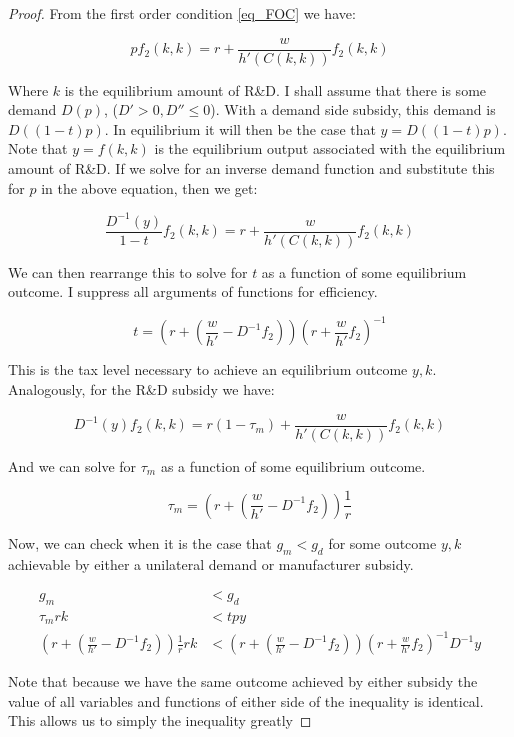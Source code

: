\documentclass{article}
\begin{document}
\begin{proof}
From the first order condition \ref{eq_FOC} we have:

\[
p f_2(k,k) = r + \frac{w}{h'(C(k,k))} f_2 (k,k)
\]

Where $k$ is the equilibrium amount of R\&D. I shall assume that there is some demand $D(p)$, ($D'>0, D'' \leq 0$). With a demand side subsidy, this demand is $D((1-t)p)$. In equilibrium it will then be the case that $y = D((1-t)p) $. Note that $y = f(k,k)$ is the equilibrium output associated with the equilibrium amount of R\&D. If we solve for an inverse demand function and substitute this for $p$ in the above equation, then we get:

\[
\frac{D^{-1}(y)}{1-t} f_2(k,k) = r + \frac{w}{h'(C(k,k))} f_2 (k,k)
\]

We can then rearrange this to solve for $t$ as a function of some equilibrium outcome. I suppress all arguments of functions for efficiency. 

\begin{equation}
t = \left(r + \left( \frac{w}{h'} - D^{-1} f_2 \right) \right) \left( r + \frac{w}{h'} f_2 \right)^{-1}
\label{t}
\end{equation}

This is the tax level necessary to achieve an equilibrium outcome $y,k$.  Analogously, for the R\&D subsidy we have:

\[
D^{-1}(y) f_2(k,k) = r(1-\tau_m) + \frac{w}{h'(C(k,k))} f_2 (k,k)
\]

And we can solve for $\tau_m$ as a function of some equilibrium outcome. 

\begin{equation}
\tau_m = \left(r + \left( \frac{w}{h'} - D^{-1} f_2 \right) \right) \frac{1}{r}
\label{tau_m}
\end{equation}

Now, we can check when it is the case that $g_m<g_d$ for some outcome $y,k$ achievable by either a unilateral demand or manufacturer subsidy.

\begin{align*}
g_m&<g_d \\
\tau_m r k &< tpy \\
\left(r + \left( \frac{w}{h'} - D^{-1} f_2 \right) \right) \frac{1}{r} rk &<  \left(r + \left( \frac{w}{h'} - D^{-1} f_2 \right) \right) \left( r + \frac{w}{h'} f_2 \right)^{-1} D^{-1} y
\end{align*}

Note that because we have the same outcome achieved by either subsidy the value of all variables and functions of either side of the inequality is identical. This allows us to simply the inequality greatly


\end{proof}
\end{document}
